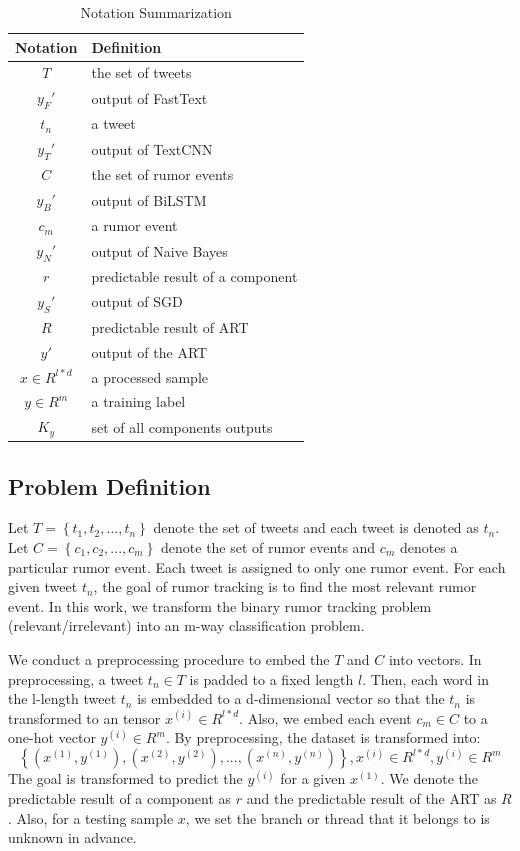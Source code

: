 \begin{table}
	\caption{Notation Summarization}
	\centering
	\label{tab:notations}
	\begin{tabular}{|c|l|}
		\hline
		\textbf{Notation} & \textbf{Definition}\\
		\hline
		$T$ & the set of tweets \\
		\hline
		$y_F'$ & output of FastText \\
		\hline
		$t_n$ & a tweet\\
		\hline		
		$y_T'$ & output of TextCNN\\
		\hline
		$C$ & the set of rumor events\\
		\hline
		$y_B'$ & output of BiLSTM\\
		\hline
		$c_m$ & a rumor event \\
		\hline
		$y_N'$ & output of Naive Bayes\\
		\hline
		$r$ & predictable result of a component\\
		\hline
		$y_S'$ & output of SGD\\
		\hline
		$R$ & predictable result of ART\\
		\hline
		$y'$& output of the ART\\
		\hline
		$x \in R^{l*d}$ & a processed sample\\
		\hline
		$y \in R^m$ & a training label\\
		\hline
		$K_y$ & set of all components outputs\\		
		\hline						
	\end{tabular}
\end{table}

\subsection{Problem Definition}
\label{sec:problem}
Let $T = \left\{t_1, t_2, ..., t_n \right\}$ denote the set of tweets and each tweet is denoted as $t_n$. Let $C = \left\{c_1, c_2, ... , c_m \right\}$ denote the set of rumor events and $c_m$ denotes a particular rumor event. Each tweet is assigned to only one rumor event. For each given tweet $t_n$, the goal of rumor tracking is to find the most relevant rumor event. In this work, we transform the binary rumor tracking problem (relevant/irrelevant) into an m-way classification problem. 

We conduct a preprocessing procedure to embed the $T$ and $C$ into vectors. In preprocessing, a tweet $t_n \in T $ is padded to a fixed length $l$. Then, each word in the l-length tweet $t_n$ is embedded to a d-dimensional vector so that the $t_n$ is transformed to an tensor $x^{(i)} \in R^{l*d}$. Also, we embed each event $c_m \in C$ to a one-hot vector $y^{(i)} \in R^m$. By preprocessing, the dataset is transformed into: $$\left\{ (x^{(1)}, y^{(1)}), (x^{(2)}, y^{(2)}),..., (x^{(n)}, y^{(n)}) \right\}, x^{(i)} \in R^{l*d}, y^{(i)} \in R^m $$ The goal is transformed to predict the $y^{(i)}$ for a given $x^{(1)}$. We denote the predictable result of a component as $r$ and the predictable result of the ART as $R$. Also, for a testing sample $x$, we set the branch or thread that it belongs to is unknown in advance. 

